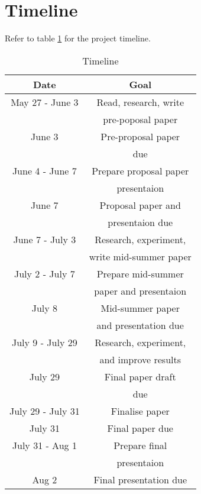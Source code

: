 \section{Timeline}
\label{sec:timeline}

Refer to table \ref{tab:timeline} for the project timeline.

\begin{table}[!ht]
	\centering
	
	\begin{tabular}{|c|c|}
		\hline
		\textbf{Date} & \textbf{Goal} \\
		\hline
		May 27 - June 3 & Read, research, write \\
		& pre-poposal paper \\
		\hline
		June 3 & Pre-proposal paper \\
		& due \\
		\hline
		June 4 - June 7 & Prepare proposal paper \\
		& presentaion \\
		\hline
		June 7 & Proposal paper and \\
		& presentaion due \\
		\hline
		June 7 - July 3 & Research, experiment, \\
		& write mid-summer paper \\
		\hline
		July 2 - July 7 & Prepare mid-summer \\
		& paper and presentaion \\
		\hline
		July 8 & Mid-summer paper \\
		& and presentation due \\
		\hline
		July 9 - July 29 & Research, experiment, \\
		& and improve results \\
		\hline
		July 29 & Final paper draft \\
		& due \\
		\hline
		July 29 - July 31 & Finalise paper \\
		\hline
		July 31 & Final paper due \\
		\hline
		July 31 - Aug 1 & Prepare final \\
		& presentaion \\
		\hline
		Aug 2 & Final presentation due \\
		\hline
	\end{tabular}

\caption{Timeline}
\label{tab:timeline}
\end{table}
